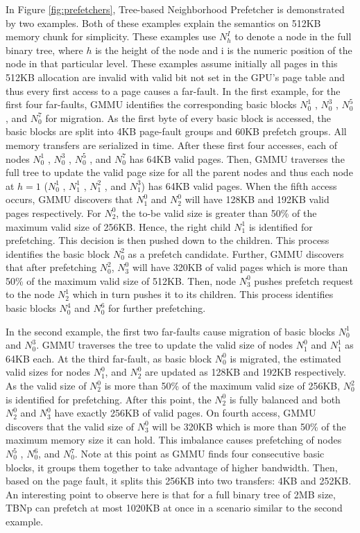 In Figure \ref{fig:prefetchers}, Tree-based Neighborhood Prefetcher is demonstrated by two examples. Both of these examples explain the semantics on 512KB memory chunk for simplicity. These examples use $N_h^I$ to denote a node in the full binary tree, where $h$ is the height of the node and i is the numeric position of the node in that particular level. These examples assume initially all pages in this 512KB allocation are invalid with valid bit not set in the GPU’s page table and thus every first access to a page causes a far-fault. In the first example, for the first four far-faults, GMMU identifies the corresponding basic blocks $N^1_0$ , $N^3_0$ , $N^5_0$ , and $N^7_0$ for migration. As the first byte of every basic block is accessed, the basic blocks are split into 4KB page-fault groups and 60KB prefetch groups. All memory transfers are serialized in time. After these first four accesses, each of nodes $N^1_0$ , $N^3_0$ , $N^5_0$ , and $N^7_0$ has 64KB valid pages. Then, GMMU traverses the full tree to update the valid page size for all the parent nodes and thus each node at $h = 1$ ($N^1_0$ , $N^1_1$ , $N^2_1$ , and $N^3_1$) has 64KB valid pages. When the fifth access occurs, GMMU discovers that $N^0_1$ and $N^0_2$ will have 128KB and 192KB valid pages respectively. For $N^0_2$, the to-be valid size is greater than 50\% of the maximum valid size of 256KB. Hence, the right child $N^1_1$ is identified for prefetching. This decision is then pushed down to the children. This process identifies the basic block $N^2_0$ as a prefetch candidate. Further, GMMU discovers that after prefetching $N^2_0$, $N^0_3$ will have 320KB of valid pages which is more than 50\% of the maximum valid size of 512KB. Then, node $N^0_3$ pushes prefetch request to the node $N^1_2$ which in turn pushes it to its children. This process identifies basic blocks $N^4_0$ and $N^6_0$ for further prefetching.

In the second example, the first two far-faults cause migration of basic blocks $N^1_0$ and $N^3_0$. GMMU traverses the tree to update the valid size of nodes $N^0_1$ and $N^1_1$ as 64KB each. At the third far-fault, as basic block $N^0_0$ is migrated, the estimated valid sizes for nodes $N^0_1$, and $N^0_2$ are updated as 128KB and 192KB respectively. As the valid size of $N^0_2$ is more than 50\% of the maximum valid size of 256KB, $N^2_0$ is identified for prefetching. After this point, the $N^0_2$ is fully balanced and both $N^0_2$ and $N^0_3$ have exactly 256KB of valid pages. On fourth access, GMMU discovers that the valid size of $N^0_3$ will be 320KB which is more than 50\% of the maximum memory size it can hold. This imbalance causes prefetching of nodes $N^5_0$ , $N^6_0$, and $N^7_0$. Note at this point as GMMU finds four consecutive basic blocks, it groups them together to take advantage of higher bandwidth. Then, based on the page fault, it splits this 256KB into two transfers: 4KB and 252KB. An interesting point to observe here is that for a full binary tree of 2MB size, TBNp can prefetch at most 1020KB at once in a scenario similar to the second example.